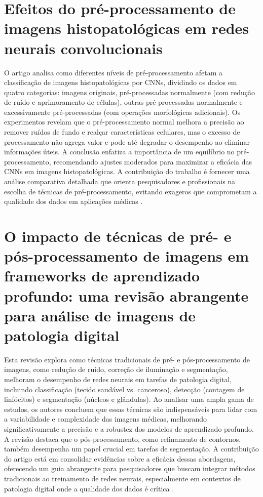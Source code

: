 \section{Efeitos do pré-processamento de imagens histopatológicas em redes neurais convolucionais}
O artigo analisa como diferentes níveis de pré-processamento afetam a classificação de imagens histopatológicas por CNNs, dividindo os dados em quatro categorias: imagens originais, pré-processadas normalmente (com redução de ruído e aprimoramento de células), outras pré-processadas normalmente e excessivamente pré-processadas (com operações morfológicas adicionais). Os experimentos revelam que o pré-processamento normal melhora a precisão ao remover ruídos de fundo e realçar características celulares, mas o excesso de processamento não agrega valor e pode até degradar o desempenho ao eliminar informações úteis. A conclusão enfatiza a importância de um equilíbrio no pré-processamento, recomendando ajustes moderados para maximizar a eficácia das CNNs em imagens histopatológicas. A contribuição do trabalho é fornecer uma análise comparativa detalhada que orienta pesquisadores e profissionais na escolha de técnicas de pré-processamento, evitando exageros que comprometam a qualidade dos dados em aplicações médicas \cite{ozturk2018histopathological}.

\section{O impacto de técnicas de pré- e pós-processamento de imagens em frameworks de aprendizado profundo: uma revisão abrangente para análise de imagens de patologia digital}
Esta revisão explora como técnicas tradicionais de pré- e pós-processamento de imagens, como redução de ruído, correção de iluminação e segmentação, melhoram o desempenho de redes neurais em tarefas de patologia digital, incluindo classificação (tecido saudável vs. canceroso), detecção (contagem de linfócitos) e segmentação (núcleos e glândulas). Ao analisar uma ampla gama de estudos, os autores concluem que essas técnicas são indispensáveis para lidar com a variabilidade e complexidade das imagens médicas, melhorando significativamente a precisão e a robustez dos modelos de aprendizado profundo. A revisão destaca que o pós-processamento, como refinamento de contornos, também desempenha um papel crucial em tarefas de segmentação. A contribuição do artigo está em consolidar evidências sobre a eficácia dessas abordagens, oferecendo um guia abrangente para pesquisadores que buscam integrar métodos tradicionais ao treinamento de redes neurais, especialmente em contextos de patologia digital onde a qualidade dos dados é crítica \cite{Salvi2021}.


